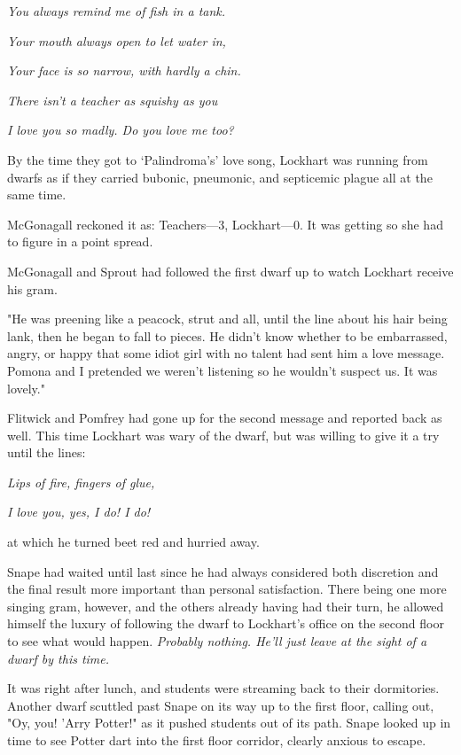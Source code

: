 \emph{You always remind me of fish in a tank.}

\emph{Your mouth always open to let water in,}

\emph{Your face is so narrow, with hardly a chin.}

\emph{There isn't a teacher as squishy as you}

\emph{I love you so madly. Do you love me too?}

By the time they got to `Palindroma's' love song, Lockhart was running from dwarfs as if they carried bubonic, pneumonic, and septicemic plague all at the same time.

McGonagall reckoned it as: Teachers—3, Lockhart—0. It was getting so she had to figure in a point spread.

McGonagall and Sprout had followed the first dwarf up to watch Lockhart receive his gram.

"He was preening like a peacock, strut and all, until the line about his hair being lank, then he began to fall to pieces. He didn't know whether to be embarrassed, angry, or happy that some idiot girl with no talent had sent him a love message. Pomona and I pretended we weren't listening so he wouldn't suspect us. It was lovely."

Flitwick and Pomfrey had gone up for the second message and reported back as well. This time Lockhart was wary of the dwarf, but was willing to give it a try until the lines:

\emph{Lips of fire, fingers of glue,}

\emph{I love you, yes, I do! I do!}

at which he turned beet red and hurried away.

Snape had waited until last since he had always considered both discretion and the final result more important than personal satisfaction. There being one more singing gram, however, and the others already having had their turn, he allowed himself the luxury of following the dwarf to Lockhart's office on the second floor to see what would happen. \emph{Probably nothing. He'll just leave at the sight of a dwarf by this time.}

It was right after lunch, and students were streaming back to their dormitories. Another dwarf scuttled past Snape on its way up to the first floor, calling out, "Oy, you! 'Arry Potter!" as it pushed students out of its path. Snape looked up in time to see Potter dart into the first floor corridor, clearly anxious to escape.


